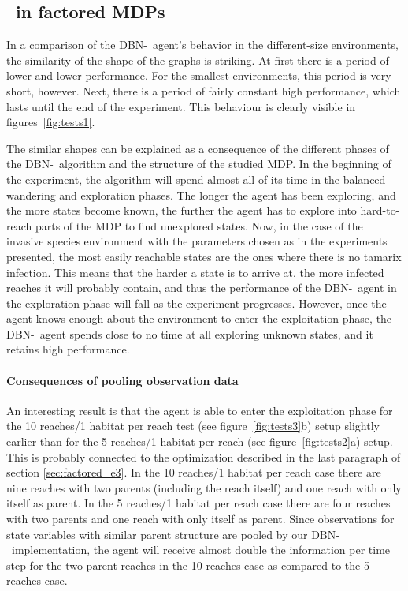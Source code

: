 \subsection{\etre\ in factored MDPs}
\label{sec:e3_factored_discussion}
In a comparison of the DBN-\etre\ agent's behavior in the different-size environments, the similarity of the shape of the graphs is striking. At first there is a period of lower and lower performance. For the smallest environments, this period is very short, however. Next, there is a period of fairly constant high performance, which lasts until the end of the experiment. This behaviour is clearly visible in figures~\ref{fig:tests1}.   

The similar shapes can be explained as a consequence of the different phases  of the DBN-\etre\ algorithm and the structure of the studied MDP. In the beginning of the experiment, the algorithm will spend almost all of its time in the balanced wandering and exploration phases. The longer the agent has been exploring, and the more states become known, the further the agent has to explore into hard-to-reach parts of the MDP to find unexplored states. Now, in the case of the invasive species environment with the parameters chosen as in the experiments presented, the most easily reachable states are the ones where there is no tamarix infection. This means that the harder a state is to arrive at, the more infected reaches it will probably contain, and thus the performance of the DBN-\etre\ agent in the exploration phase will fall as the experiment progresses. However, once the agent knows enough about the environment to enter the exploitation phase, the DBN-\etre\ agent spends close to no time at all exploring unknown states, and it retains high performance. 

\paragraph{Consequences of pooling observation data} An interesting result is that the agent is able to enter the exploitation phase for the 10 reaches/1 habitat per reach test (see figure~\ref{fig:tests3}b) setup slightly earlier than for the 5 reaches/1 habitat per reach (see figure~\ref{fig:tests2}a) setup. This is probably connected to the optimization described in the last paragraph of section \ref{sec:factored_e3}. In the 10 reaches/1 habitat per reach case there are nine reaches with two parents (including the reach itself) and one reach with only itself as parent. In the 5 reaches/1 habitat per reach case there are four reaches with two parents and one reach with only itself as parent. Since observations for state variables with similar parent structure are pooled by our DBN-\etre\ implementation, the agent will receive almost double the information per time step for the two-parent reaches in the 10 reaches case as compared to the 5 reaches case.  

